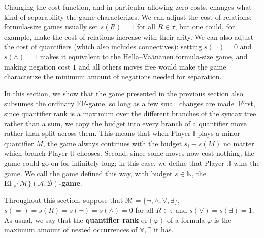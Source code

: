 \documentclass{article}
\theoremstyle{definition}
\begin{document}
Changing the cost function, and in particular allowing zero costs, changes what kind of separability the game characterizes. We can adjust the cost of relations: formula-size games usually set $s(R)=1$ for all $R\in \tau$, but one could, for example, make the cost of relations increase with their arity. We can also adjust the cost of quantifiers (which also includes connectives): setting $s(\neg)=0$ and $s(\land)=1$ makes it equivalent to the Hella--Väänänen formula-size game, and making negation cost $1$ and all others moves free would make the game characterize the minimum amount of negations needed for separation.

In this section, we show that the game presented in the previous section also subsumes the ordinary EF-game, so long as a few small changes are made. First, since quantifier rank is a maximum over the different branches of the syntax tree rather than a sum, we copy the budget into every branch of a quantifier move rather than split across them. This means that when Player $\mathbb{I}$ plays a minor quantifier $M$, the game always continues with the budget $s_i-s(M)$ no matter which branch Player $\mathbb{II}$ chooses. Second, since some moves now cost nothing, the game could go on for infinitely long; in this case, we define that Player $\mathbb{II}$ wins the game. We call the game defined this way, with budget $s\in\mathbb{N}$, the $\mathrm{EF}_s\{\mathcal{M}\}(\mathcal{A},\mathcal{B})$\textbf{-game}.


Throughout this section, suppose that $\mathcal{M}=\{\neg,\land,\forall,\exists\}$, $s(=)=s(R)=s(\neg)=s(\land)=0$ for all $R\in\tau$ and $s(\forall)=s(\exists)=1$. As usual, we say that the \textbf{quantifier rank} $\mathrm{qr}(\varphi)$ of a formula $\varphi$ is the maximum amount of nested occurrences of $\forall,\exists$ it has.
\end{document}
